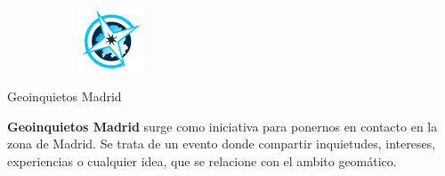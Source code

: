 \documentclass[11pt,a5]{article}
\newcommand{\alert}[1]{\textbf{\color{VerdeOscuro2!80!black}#1}}
\begin{document}
\begin{figure}[h]
\begin{subfigure}[b]{0.12\textwidth}
        \end{subfigure}%
        ~
        \begin{subfigure}[b]{0.12\textwidth}
                \centering
                \includegraphics[width=\textwidth]{img/logo_xeoinquedos}
        \end{subfigure}%
\end{figure}

\begin{center}
\color{VerdeOscuro2!50!black}\huge Geoinquietos Madrid
\end{center}

\alert{Geoinquietos Madrid} surge como iniciativa para ponernos en contacto en
la zona de Madrid. Se trata de un evento donde compartir inquietudes, intereses,
experiencias o cualquier idea, que se relacione con el ambito geomático.
\end{document}
